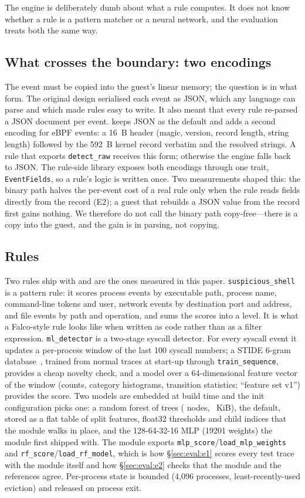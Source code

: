 The engine is deliberately dumb about what a rule computes. It does not
know whether a rule is a pattern matcher or a neural network, and the
evaluation treats both the same way.

\subsection{What crosses the boundary: two encodings}
\label{sec:design:wire}
The event must be copied into the guest's linear memory; the question is in
what form. The original design serialised each event as JSON, which any
language can parse and which made rules easy to write. It also meant that
every rule re-parsed a JSON document per event. \sys keeps JSON as the
default and adds a second encoding for eBPF events: a \SI{16}{B} header
(magic, version, record length, string length) followed by the
\SI{592}{B} kernel record verbatim and the resolved strings. A rule that
exports \texttt{detect\_raw} receives this form; otherwise the engine falls
back to JSON. The rule-side library exposes both encodings through one
trait, \texttt{EventFields}, so a rule's logic is written once. Two
measurements shaped this: the binary path halves the per-event cost of a
real rule only when the rule reads fields directly from the record (E2);
a guest that rebuilds a JSON value from the record first gains nothing.
We therefore do not call the binary path copy-free---there is a
copy into the guest, and the gain is in parsing, not copying.

\subsection{Rules}
\label{sec:design:rules}
Two rules ship with \sys and are the ones measured in this paper.
\texttt{suspicious\_shell} is a pattern rule: it scores process events by
executable path, process name, command-line tokens and user, network
events by destination port and address, and file events by path and
operation, and sums the scores into a level. It is what a Falco-style rule
looks like when written as code rather than as a filter expression.
\texttt{ml\_detector} is a two-stage syscall detector. For every syscall
event it updates a per-process window of the last 100 syscall numbers;
a STIDE 6-gram database~\cite{stide}, trained from normal traces at
start-up through \texttt{train\_sequence}, provides a cheap novelty check,
and a model over a 64-dimensional feature vector of the window (counts,
category histograms, transition statistics; ``feature set v1'') provides
the score. Two models are embedded at build time and the init
configuration picks one: a random forest of \rfTrees{} trees (\rfNodes{}
nodes, \rfKiB{}~KiB), the default, stored as a flat table of split
features, float32 thresholds and child indices that the module walks in
place, and the 128-64-32-16 MLP (\num{19201} weights) the module first
shipped with. The module exports
\texttt{mlp\_score}/\texttt{load\_mlp\_weights} and
\texttt{rf\_score}/\texttt{load\_rf\_model}, which is how
\S\ref{sec:eval:e1} scores every test trace with the module itself and how
\S\ref{sec:eval:e2} checks that the module and the references agree.
Per-process state is bounded (4,096 processes, least-recently-used
eviction) and released on process exit.

